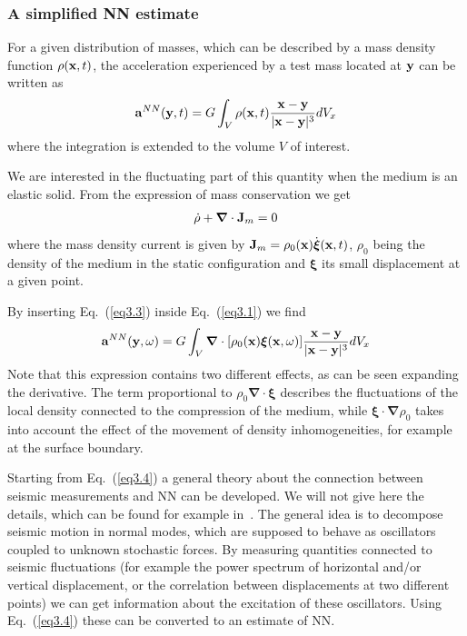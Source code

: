 \FloatBarrier
\subsubsection{A simplified NN estimate}
\label{subsub:NNanalyticalestimation}
For a given distribution of masses, which can be described by a mass density function $\rho({\bf x},t)$, the acceleration experienced by a test mass located at ${\bf y}$ can be written as
\begin{eqnarray}
	{\bf a}^{NN}({\bf y},t)=G\int_{V}\rho({\bf x},t)
        \frac{\bf x-y}{|{\bf x-y}|^{3}}                        
        dV_{x}
	\label{eq3.1}
\end{eqnarray}
where the integration is extended to the volume $V$ of interest.

We are interested in the fluctuating part of this quantity when the medium is an elastic solid. From the expression of mass conservation we get
\begin{eqnarray}
	\dot{\rho}+{\boldsymbol \nabla}\cdot{\bf J}_{m}=0
	\label{eq3.3}
\end{eqnarray}
where the mass density current is given by ${\bf J}_{m}=\rho_{0}({\bf x})\dot{\boldsymbol \xi}({\bf x},t)$, $\rho_{0}$ being the density of the medium in the static configuration and ${\boldsymbol \xi}$ its small displacement at a given point.

By inserting Eq.~(\ref{eq3.3}) inside Eq.~(\ref{eq3.1}) we find
\begin{eqnarray}
	{\bf a}^{NN}({\bf y},\omega)=G\int_{V} {\boldsymbol \nabla} \cdot [\rho_{0}({\bf
	x}){\boldsymbol \xi}({\bf x},\omega)]
        \frac{\bf x-y}{|{\bf x-y}|^{3}}                        
        dV_{x} \label{eq3.4}
\end{eqnarray}
Note that this expression contains two different effects, as can be seen
expanding the derivative. The term proportional to $\rho_{0}
{\boldsymbol \nabla}\cdot {\boldsymbol \xi} $ describes the fluctuations of
the local density connected to the compression of the medium, while
${\boldsymbol \xi} \cdot {\boldsymbol \nabla}\rho_{0}$ takes into account
the effect of the movement of density inhomogeneities, for example at the
surface boundary.

Starting from Eq.~(\ref{eq3.4}) a general theory about the connection between seismic measurements and NN can be developed. We will not give here the details, which can be found for example in~\cite{Beker2010GRG}. The general idea is to decompose seismic motion in normal modes, which are supposed to behave as oscillators coupled to unknown stochastic forces. By measuring quantities connected to seismic fluctuations (for example the power spectrum of horizontal and/or vertical displacement, or the correlation between displacements at two different points) we can get information about the excitation of these oscillators. Using Eq.~(\ref{eq3.4}) these can be converted to an estimate of NN.

